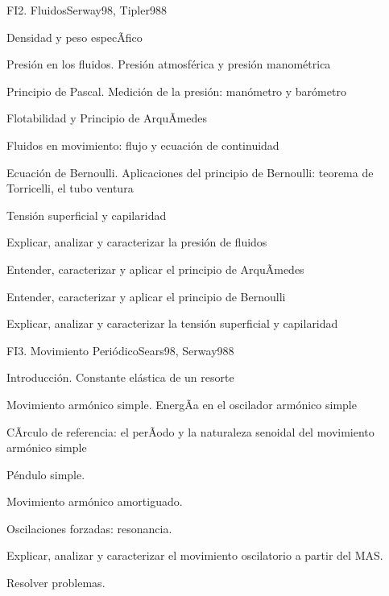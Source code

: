 \begin{syllabus}
\begin{unit}{FI2. Fluidos}{Serway98, Tipler98}{8}
\begin{topics}
         \item  Densidad y peso especÃ­fico
	 \item  Presión en los fluidos. Presión atmosférica y presión manométrica
         \item  Principio de Pascal. Medición de la presión: manómetro y barómetro
	 \item  Flotabilidad y Principio de ArquÃ­medes
         \item  Fluidos en movimiento: flujo y ecuación de continuidad
	 \item  Ecuación de Bernoulli. Aplicaciones del principio de Bernoulli: teorema de Torricelli, el tubo ventura
         \item  Tensión superficial y capilaridad
   \end{topics}

   \begin{unitgoals}
         \item  Explicar, analizar y caracterizar la presión de fluidos
         \item  Entender, caracterizar y aplicar el principio de ArquÃ­medes
         \item  Entender, caracterizar y aplicar el principio de Bernoulli
         \item  Explicar, analizar y caracterizar la tensión superficial y capilaridad
   \end{unitgoals}
\end{unit}

\begin{unit}{FI3. Movimiento Periódico}{Sears98, Serway98}{8}
\begin{topics}
         \item  Introducción. Constante elástica de un resorte
	 \item  Movimiento armónico simple. EnergÃ­a en el oscilador armónico simple
         \item  CÃ­rculo de referencia: el perÃ­odo y la naturaleza senoidal del movimiento armónico simple
	 \item  Péndulo simple.
         \item  Movimiento armónico amortiguado.
         \item  Oscilaciones forzadas: resonancia.
   \end{topics}

   \begin{unitgoals}
         \item  Explicar, analizar y caracterizar el movimiento oscilatorio a partir del MAS.
         \item  Resolver problemas.
   \end{unitgoals}
\end{unit}


\end{syllabus}
